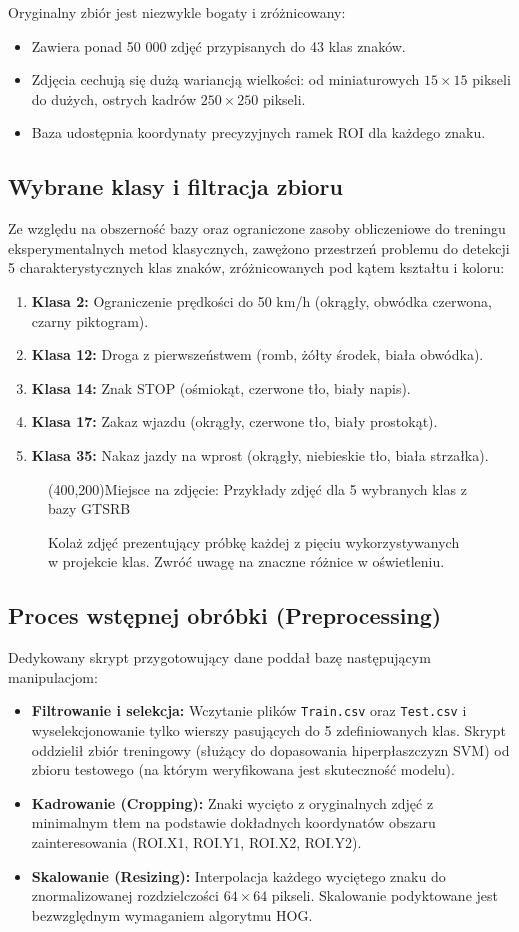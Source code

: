 \documentclass[12pt,a4paper]{article}
\newcommand{\placeholderimage}[2]{
    \begin{figure}[H]
        \centering
        \framebox(400,200){Miejsce na zdjęcie: #1}
        \caption{#2}
    \end{figure}
}
\begin{document}
Oryginalny zbiór jest niezwykle bogaty i zróżnicowany:
\begin{itemize}
    \item Zawiera ponad 50 000 zdjęć przypisanych do 43 klas znaków.
    \item Zdjęcia cechują się dużą wariancją wielkości: od miniaturowych $15\times15$ pikseli do dużych, ostrych kadrów $250\times250$ pikseli.
    \item Baza udostępnia koordynaty precyzyjnych ramek ROI dla każdego znaku.
\end{itemize}

\subsection{Wybrane klasy i filtracja zbioru}
Ze względu na obszerność bazy oraz ograniczone zasoby obliczeniowe do treningu eksperymentalnych metod klasycznych, zawężono przestrzeń problemu do detekcji 5 charakterystycznych klas znaków, zróżnicowanych pod kątem kształtu i koloru:
\begin{enumerate}
    \item \textbf{Klasa 2:} Ograniczenie prędkości do 50 km/h (okrągły, obwódka czerwona, czarny piktogram).
    \item \textbf{Klasa 12:} Droga z pierwszeństwem (romb, żółty środek, biała obwódka).
    \item \textbf{Klasa 14:} Znak STOP (ośmiokąt, czerwone tło, biały napis).
    \item \textbf{Klasa 17:} Zakaz wjazdu (okrągły, czerwone tło, biały prostokąt).
    \item \textbf{Klasa 35:} Nakaz jazdy na wprost (okrągły, niebieskie tło, biała strzałka).
\end{enumerate}

\placeholderimage{Przykłady zdjęć dla 5 wybranych klas z bazy GTSRB}{Kolaż zdjęć prezentujący próbkę każdej z pięciu wykorzystywanych w projekcie klas. Zwróć uwagę na znaczne różnice w oświetleniu.}

\subsection{Proces wstępnej obróbki (Preprocessing)}
Dedykowany skrypt przygotowujący dane poddał bazę następującym manipulacjom:
\begin{itemize}
    \item \textbf{Filtrowanie i selekcja:} Wczytanie plików \texttt{Train.csv} oraz \texttt{Test.csv} i wyselekcjonowanie tylko wierszy pasujących do 5 zdefiniowanych klas. Skrypt oddzielił zbiór treningowy (służący do dopasowania hiperpłaszczyzn SVM) od zbioru testowego (na którym weryfikowana jest skuteczność modelu).
    \item \textbf{Kadrowanie (Cropping):} Znaki wycięto z oryginalnych zdjęć z minimalnym tłem na podstawie dokładnych koordynatów obszaru zainteresowania (ROI.X1, ROI.Y1, ROI.X2, ROI.Y2).
    \item \textbf{Skalowanie (Resizing):} Interpolacja każdego wyciętego znaku do znormalizowanej rozdzielczości $64\times64$ pikseli. Skalowanie podyktowane jest bezwzględnym wymaganiem algorytmu HOG.
\end{itemize}
\end{document}
